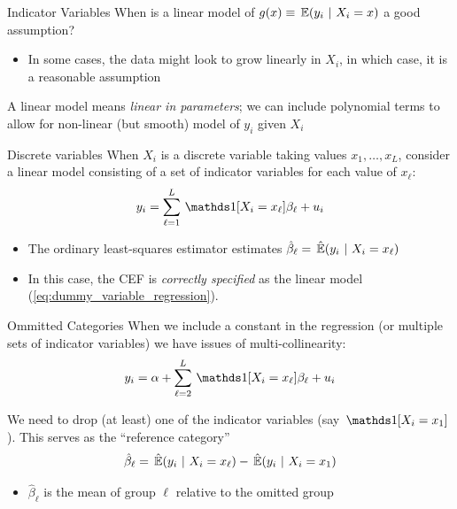 \documentclass[aspectratio=169,t,11pt,table]{beamer}
\begin{document}
\begin{frame}{Indicator Variables}
  When is a linear model of $g(x) \equiv \expec{y_i}{X_i = x}$ a good assumption?
  \begin{itemize}
    \item In some cases, the data might look to grow linearly in $X_i$, in which case, it is a reasonable assumption
  \end{itemize}

  \pause
  \bigskip
  A linear model means \emph{linear in parameters}; we can include polynomial terms to allow for non-linear (but smooth) model of $y_i$ given $X_i$
\end{frame}

\begin{frame}{Discrete variables}
  When $X_i$ is a discrete variable taking values $x_1, \dots, x_L$, consider a linear model consisting of a set of \alert{indicator variables} for each value of $x_\ell$:
  \begin{equation}\label{eq:dummy_variable_regression}
    y_i = \sum_{\ell = 1}^L \one{X_i = x_\ell} \beta_\ell + u_i
  \end{equation}
  \pause
  \begin{itemize}
    \item The ordinary least-squares estimator estimates $\hat{\beta}_{\ell} = \expechat{y_i}{X_i = x_\ell}$

    \pause
    \item In this case, the CEF is \emph{correctly specified} as the linear model (\ref{eq:dummy_variable_regression}).
  \end{itemize}
\end{frame}

\begin{frame}{Ommitted Categories}
  When we include a constant in the regression (or multiple sets of indicator variables) we have issues of \alert{multi-collinearity}:
  $$
    y_i = \alpha + \sum_{\ell = 2}^L \one{X_i = x_\ell} \beta_\ell + u_i
  $$

  We need to drop (at least) one of the indicator variables (say $\one{X_i = x_1}$). This serves as the ``reference category''
  $$
    \hat{\beta}_{\ell} = \expechat{y_i}{X_i = x_\ell} - \expechat{y_i}{X_i = x_1}
  $$
  \begin{itemize}
    \item $\hat{\beta}_{\ell}$ is the mean of group $\ell$ relative to the omitted group
  \end{itemize}
\end{frame}
\end{document}
